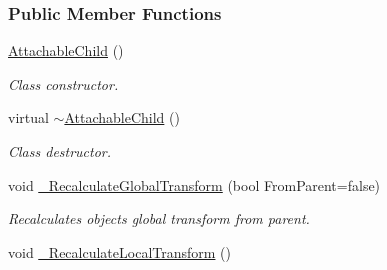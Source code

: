 \subsubsection*{Public Member Functions}
\begin{DoxyCompactItemize}
\item 
\hypertarget{classMezzanine_1_1AttachableChild_aa1baf517c478f03c0116ccf6df62f750}{
\hyperlink{classMezzanine_1_1AttachableChild_aa1baf517c478f03c0116ccf6df62f750}{AttachableChild} ()}
\label{classMezzanine_1_1AttachableChild_aa1baf517c478f03c0116ccf6df62f750}

\begin{DoxyCompactList}\small\item\em Class constructor. \item\end{DoxyCompactList}\item 
\hypertarget{classMezzanine_1_1AttachableChild_a7413197e41b31ae33df5ff02317548c0}{
virtual \hyperlink{classMezzanine_1_1AttachableChild_a7413197e41b31ae33df5ff02317548c0}{$\sim$AttachableChild} ()}
\label{classMezzanine_1_1AttachableChild_a7413197e41b31ae33df5ff02317548c0}

\begin{DoxyCompactList}\small\item\em Class destructor. \item\end{DoxyCompactList}\item 
void \hyperlink{classMezzanine_1_1AttachableChild_ad34350de631e502a8bc3d4ce25fff4f6}{\_\-RecalculateGlobalTransform} (bool FromParent=false)
\begin{DoxyCompactList}\small\item\em Recalculates objects global transform from parent. \item\end{DoxyCompactList}\item 
\hypertarget{classMezzanine_1_1AttachableChild_a500d824fc29de69ac05ffcdbdaf67e9e}{
void \hyperlink{classMezzanine_1_1AttachableChild_a500d824fc29de69ac05ffcdbdaf67e9e}{\_\-RecalculateLocalTransform} ()}
\label{classMezzanine_1_1AttachableChild_a500d824fc29de69ac05ffcdbdaf67e9e}


\end{DoxyCompactItemize}
